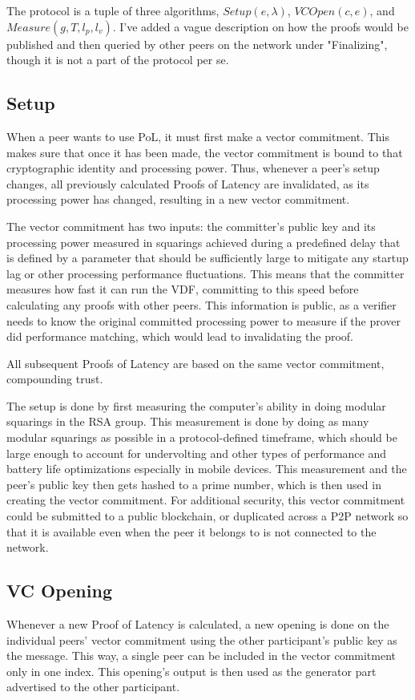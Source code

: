 The protocol is a tuple of three algorithms, \(\allowbreak Setup(e, \lambda)\), \(\allowbreak VCOpen(c, e)\), and \(\allowbreak Measure(g, T, l_p, l_v)\). I've added a vague description on how the proofs would be published and then queried by other peers on the network under "Finalizing", though it is not a part of the protocol per se.

\subsection{Setup}
When a peer wants to use PoL, it must first make a vector commitment. This makes sure that once it has been made, the vector commitment is bound to that cryptographic identity and processing power. Thus, whenever a peer's setup changes, all previously calculated Proofs of Latency are invalidated, as its processing power has changed, resulting in a new vector commitment.

The vector commitment has two inputs: the committer's public key and its processing power measured in squarings achieved during a predefined delay that is defined by a parameter that should be sufficiently large to mitigate any startup lag or other processing performance fluctuations. This means that the committer measures how fast it can run the VDF, committing to this speed before calculating any proofs with other peers. This information is public, as a verifier needs to know the original committed processing power to measure if the prover did performance matching, which would lead to invalidating the proof.

All subsequent Proofs of Latency are based on the same vector commitment, compounding trust.

The setup is done by first measuring the computer's ability in doing modular squarings in the RSA group. This measurement is done by doing as many modular squarings as possible in a protocol-defined timeframe, which should be large enough to account for undervolting and other types of performance and battery life optimizations especially in mobile devices. This measurement and the peer's public key then gets hashed to a prime number, which is then used in creating the vector commitment. For additional security, this vector commitment could be submitted to a public blockchain, or duplicated across a P2P network so that it is available even when the peer it belongs to is not connected to the network.

\subsection{VC Opening}
Whenever a new Proof of Latency is calculated, a new opening is done on the individual peers' vector commitment using the other participant's public key as the message. This way, a single peer can be included in the vector commitment only in one index. This opening's output is then used as the generator part advertised to the other participant.

